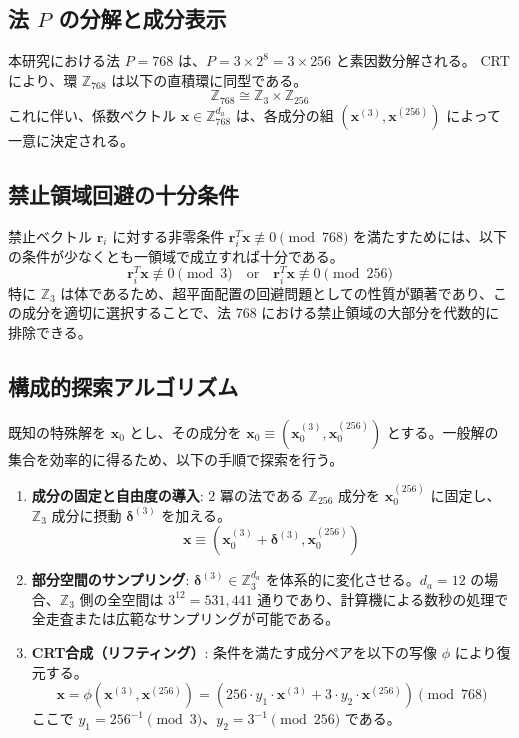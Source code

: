 \documentclass[a4paper,11pt,dvipdfmx]{jsarticle}
\theoremstyle{definition}
\begin{document}
\subsection{法 $P$ の分解と成分表示}
本研究における法 $P=768$ は、$P = 3 \times 2^8 = 3 \times 256$ と素因数分解される。
CRTにより、環 $\mathbb{Z}_{768}$ は以下の直積環に同型である。
\begin{equation}
    \mathbb{Z}_{768} \cong \mathbb{Z}_3 \times \mathbb{Z}_{256}
\end{equation}
これに伴い、係数ベクトル $\mathbf{x} \in \mathbb{Z}_{768}^{d_a}$ は、各成分の組 $(\mathbf{x}^{(3)}, \mathbf{x}^{(256)})$ によって一意に決定される。

\subsection{禁止領域回避の十分条件}
禁止ベクトル $\mathbf{r}_i$ に対する非零条件 $\mathbf{r}_i^T \mathbf{x} \not\equiv 0 \pmod{768}$ を満たすためには、以下の条件が少なくとも一領域で成立すれば十分である。
\begin{equation}
    \mathbf{r}_i^T \mathbf{x} \not\equiv 0 \pmod 3 \quad \text{or} \quad \mathbf{r}_i^T \mathbf{x} \not\equiv 0 \pmod{256}
\end{equation}
特に $\mathbb{Z}_3$ は体であるため、超平面配置の回避問題としての性質が顕著であり、この成分を適切に選択することで、法 $768$ における禁止領域の大部分を代数的に排除できる。

\subsection{構成的探索アルゴリズム}
既知の特殊解を $\mathbf{x}_0$ とし、その成分を $\mathbf{x}_0 \equiv (\mathbf{x}_0^{(3)}, \mathbf{x}_0^{(256)})$ とする。一般解の集合を効率的に得るため、以下の手順で探索を行う。

\begin{enumerate}
    \item \textbf{成分の固定と自由度の導入}: $2$ 冪の法である $\mathbb{Z}_{256}$ 成分を $\mathbf{x}_0^{(256)}$ に固定し、$\mathbb{Z}_3$ 成分に摂動 $\mathbf{\delta}^{(3)}$ を加える。
    \begin{equation}
        \mathbf{x} \equiv (\mathbf{x}_0^{(3)} + \mathbf{\delta}^{(3)}, \mathbf{x}_0^{(256)})
    \end{equation}
    \item \textbf{部分空間のサンプリング}: $\mathbf{\delta}^{(3)} \in \mathbb{Z}_3^{d_a}$ を体系的に変化させる。$d_a=12$ の場合、$\mathbb{Z}_3$ 側の全空間は $3^{12} = 531,441$ 通りであり、計算機による数秒の処理で全走査または広範なサンプリングが可能である。
    \item \textbf{CRT合成（リフティング）}: 条件を満たす成分ペアを以下の写像 $\phi$ により復元する。
    \begin{equation}
        \mathbf{x} = \phi(\mathbf{x}^{(3)}, \mathbf{x}^{(256)}) = (256 \cdot y_1 \cdot \mathbf{x}^{(3)} + 3 \cdot y_2 \cdot \mathbf{x}^{(256)}) \pmod{768}
    \end{equation}
    ここで $y_1 = 256^{-1} \pmod 3$、$y_2 = 3^{-1} \pmod{256}$ である。
\end{enumerate}
\end{document}
